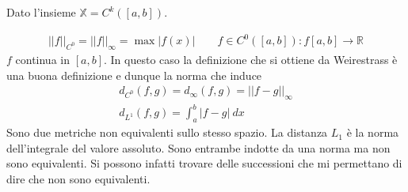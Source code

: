 \documentclass[a4paper, oneside]{book}
\begin{document}
\begin{example}
    Dato l'insieme $\mathbb{X} = C^{k}([a, b])$.
\end{example}
\begin{gather*}
    ||f|| _{C^{0} } = ||f||_{\infty} = \max |f(x) | \qquad f \in C^{0}([a, b]) : f[a, b] \to \mathbb{R} 
\end{gather*}
$f$ continua in $[a, b]$. In questo caso la definizione che si ottiene da Weirestrass è una buona definizione e dunque la norma che induce
\begin{gather*}
    d_{C^{0} }(f, g) = d_{\infty }(f, g) = ||f - g||_{\infty } \\
    d_{L^{1} }(f, g) = \int_{a}^{b} |f - g|\ dx 
\end{gather*}
Sono due metriche non equivalenti sullo stesso spazio. La distanza $L_1$ è la norma dell'integrale
del valore assoluto. Sono entrambe indotte da una norma ma non sono equivalenti. Si possono
infatti trovare delle successioni che mi permettano di dire che non sono equivalenti.
\end{document}
